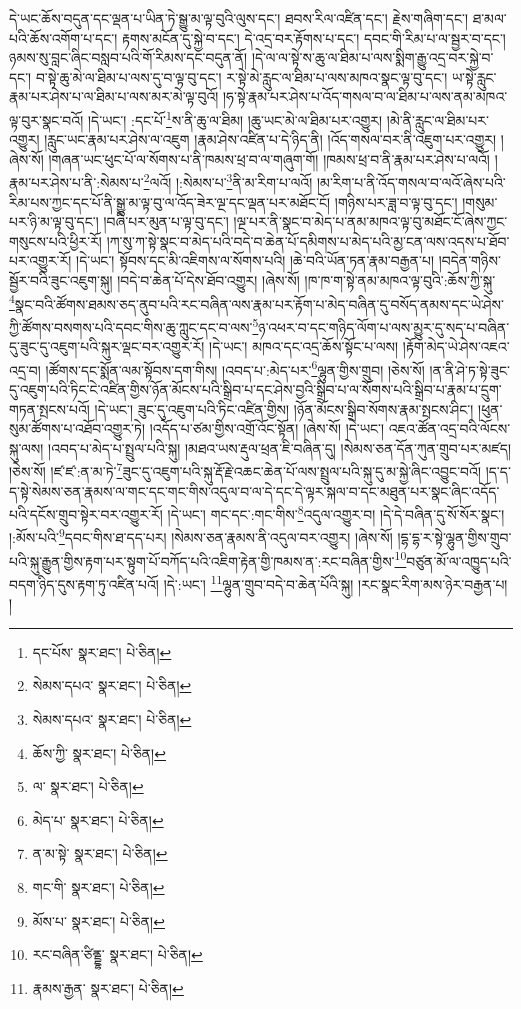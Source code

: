དེ་ཡང་ཆོས་བདུན་དང་ལྡན་པ་ཡིན་ཏེ་སྒྱུ་མ་ལྟ་བུའི་ལུས་དང་། ཐབས་རིལ་འཛིན་དང་། རྗེས་གཞིག་དང་། ཐ་མལ་པའི་ཆོས་འགོག་པ་དང་། རྟགས་མངོན་དུ་སྐྱེ་བ་དང་། དེ་འདྲ་བར་རྟོགས་པ་དང་། དབང་གི་རིམ་པ་ལ་སྦྱར་བ་དང་། ཉམས་སུ་བླང་ཞིང་བསླབ་པའི་གོ་རིམས་དང་བདུན་ནོ། །དེ་ལ་ལ་སྟེ་ས་ཆུ་ལ་ཐིམ་པ་ལས་སྨིག་རྒྱུ་འདྲ་བར་སྐྱེ་བ་དང་། བ་སྟེ་ཆུ་མེ་ལ་ཐིམ་པ་ལས་དུ་བ་ལྟ་བུ་དང་། ར་སྟེ་མེ་རླུང་ལ་ཐིམ་པ་ལས་མཁའ་སྣང་ལྟ་བུ་དང་། ཡ་སྟེ་རླུང་རྣམ་པར་ཤེས་པ་ལ་ཐིམ་པ་ལས་མར་མེ་ལྟ་བུའོ། །ཧ་སྟེ་རྣམ་པར་ཤེས་པ་འོད་གསལ་བ་ལ་ཐིམ་པ་ལས་ནམ་མཁའ་ལྟ་བུར་སྣང་བའོ། །དེ་ཡང་། :དང་པོ་\footnote{དང་པོས་  སྣར་ཐང་།  པེ་ཅིན། }ས་ནི་ཆུ་ལ་ཐིམ། །ཆུ་ཡང་མེ་ལ་ཐིམ་པར་འགྱུར། །མེ་ནི་རླུང་ལ་ཐིམ་པར་འགྱུར། །རླུང་ཡང་རྣམ་པར་ཤེས་ལ་འཇུག །རྣམ་ཤེས་འཛིན་པ་དེ་ཉིད་ནི། །འོད་གསལ་བར་ནི་འཇུག་པར་འགྱུར། །ཞེས་སོ། །གཞན་ཡང་ཕུང་པོ་ལ་སོགས་པ་ནི་ཁམས་ཕྲ་བ་ལ་གཞུག་གོ། །ཁམས་ཕྲ་བ་ནི་རྣམ་པར་ཤེས་པ་ལའོ། །རྣམ་པར་ཤེས་པ་ནི་:སེམས་པ་\footnote{སེམས་དཔའ་  སྣར་ཐང་།  པེ་ཅིན། }ལའོ། །:སེམས་པ་\footnote{སེམས་དཔའ་  སྣར་ཐང་།  པེ་ཅིན། }ནི་མ་རིག་པ་ལའོ། །མ་རིག་པ་ནི་འོད་གསལ་བ་ལའོ་ཞེས་པའི་རིམ་པས་ཀྱང་དང་པོ་ནི་སྒྱུ་མ་ལྟ་བུ་ལ་འོད་ཟེར་ལྔ་དང་ལྡན་པར་མཐོང་ངོ། །གཉིས་པར་ཟླ་བ་ལྟ་བུ་དང་། །གསུམ་པར་ཉི་མ་ལྟ་བུ་དང་། །བཞི་པར་མུན་པ་ལྟ་བུ་དང་། །ལྔ་པར་ནི་སྣང་བ་མེད་པ་ནམ་མཁའ་ལྟ་བུ་མཐོང་ངོ་ཞེས་ཀྱང་གསུངས་པའི་ཕྱིར་རོ། །ཀ་སུ་ཀ་སྟེ་སྣང་བ་མེད་པའི་བདེ་བ་ཆེན་པོ་དམིགས་པ་མེད་པའི་མྱ་ངན་ལས་འདས་པ་ཐོབ་པར་འགྱུར་རོ། །དེ་ཡང་། སྟོབས་དང་མི་འཇིགས་ལ་སོགས་པའི། །ཆེ་བའི་ཡོན་ཏན་རྣམ་བརྒྱན་པ། །བདེན་གཉིས་སྦྱོར་བའི་ཟུང་འཇུག་སྐུ། །བདེ་བ་ཆེན་པོ་དེས་ཐོབ་འགྱུར། །ཞེས་སོ། །ཁ་ཁ་ག་སྟེ་ནམ་མཁའ་ལྟ་བུའི་:ཆོས་ཀྱི་སྐུ་\footnote{ཆོས་ཀྱི་  སྣར་ཐང་།  པེ་ཅིན། }སྣང་བའི་ཚོགས་ཐམས་ཅད་ནུབ་པའི་རང་བཞིན་ལས་རྣམ་པར་རྟོག་པ་མེད་བཞིན་དུ་བསོད་ནམས་དང་ཡེ་ཤེས་ཀྱི་ཚོགས་བསགས་པའི་དབང་གིས་ཆུ་ཀླུང་དང་བ་ལས་\footnote{ལ་  སྣར་ཐང་།  པེ་ཅིན། }ཉ་འཕར་བ་དང་གཉིད་ལོག་པ་ལས་མྱུར་དུ་སད་པ་བཞིན་དུ་ཟུང་དུ་འཇུག་པའི་སྐུར་ལྡང་བར་འགྱུར་རོ། །དེ་ཡང་། མཁའ་དང་འདྲ་ཆོས་སྟོང་པ་ལས། །རྟོག་མེད་ཡེ་ཤེས་འཇའ་འདྲ་བ། །ཚོགས་དང་སྨོན་ལམ་སྟོབས་དག་གིས། །འབད་པ་:མེད་པར་\footnote{མེད་པ་  སྣར་ཐང་།  པེ་ཅིན། }ལྷུན་གྱིས་གྲུབ། །ཅེས་སོ། །ན་ནི་ཤེ་ཏ་སྟེ་ཟུང་དུ་འཇུག་པའི་ཏིང་ངེ་འཛིན་གྱིས་ཉོན་མོངས་པའི་སྒྲིབ་པ་དང་ཤེས་བྱའི་སྒྲིབ་པ་ལ་སོགས་པའི་སྒྲིབ་པ་རྣམ་པ་དྲུག་གཏན་སྤངས་པའོ། །དེ་ཡང་། ཟུང་དུ་འཇུག་པའི་ཏིང་འཛིན་གྱིས། །ཉོན་མོངས་སྒྲིབ་སོགས་རྣམ་སྤངས་ཤིང་། །ཕུན་སུམ་ཚོགས་པ་འཐོབ་འགྱུར་ཏེ། །འདོད་པ་ཙམ་གྱིས་འགྲོ་འོང་སྟོན། །ཞེས་སོ། །དེ་ཡང་། འཇའ་ཚོན་འདྲ་བའི་ལོངས་སྐུ་ལས། །འབད་པ་མེད་པ་སྤྲུལ་པའི་སྐུ། །མཐའ་ཡས་རྡུལ་ཕྲན་ཇི་བཞིན་དུ། །སེམས་ཅན་དོན་ཀུན་གྲུབ་པར་མཛད། །ཅེས་སོ། །ཛ་ཛ་:ན་མ་ཏེ་\footnote{ན་མ་སྟེ་  སྣར་ཐང་།  པེ་ཅིན། }ཟུང་དུ་འཇུག་པའི་སྐུ་རྡོ་རྗེ་འཆང་ཆེན་པོ་ལས་སྤྲུལ་པའི་སྐུ་དུ་མ་སྐྱེ་ཞིང་འབྱུང་བའོ། །ད་ད་ད་སྟེ་སེམས་ཅན་རྣམས་ལ་གང་དང་གང་གིས་འདུལ་བ་ལ་དེ་དང་དེ་ལྟར་སྐལ་བ་དང་མཐུན་པར་སྣང་ཞིང་འདོད་པའི་དངོས་གྲུབ་སྟེར་བར་འགྱུར་རོ། །དེ་ཡང་། གང་དང་:གང་གིས་\footnote{གང་གི་  སྣར་ཐང་།  པེ་ཅིན། }འདུལ་འགྱུར་བ། །དེ་དེ་བཞིན་དུ་སོ་སོར་སྣང་། །:མོས་པའི་\footnote{མོས་པ་  སྣར་ཐང་།  པེ་ཅིན། }དབང་གིས་ཐ་དད་པར། །སེམས་ཅན་རྣམས་ནི་འདུལ་བར་འགྱུར། །ཞེས་སོ། །དྷ་དྷ་ར་སྟེ་ལྷུན་གྱིས་གྲུབ་པའི་སྐུ་རྒྱུན་གྱིས་རྟག་པར་སྟུག་པོ་བཀོད་པའི་འཇིག་རྟེན་གྱི་ཁམས་ན་:རང་བཞིན་གྱིས་\footnote{རང་བཞིན་ཙིནྡྷ་  སྣར་ཐང་།  པེ་ཅིན། }བཙུན་མོ་ལ་འཁྱུད་པའི་བདག་ཉིད་དུས་རྟག་ཏུ་འཛིན་པའོ། །དེ་:ཡང་། \footnote{རྣམས་རྒྱན་  སྣར་ཐང་།  པེ་ཅིན། }ལྷུན་གྲུབ་བདེ་བ་ཆེན་པོའི་སྐུ། །རང་སྣང་རིག་མས་ཉེར་བརྒྱན་པ། །
